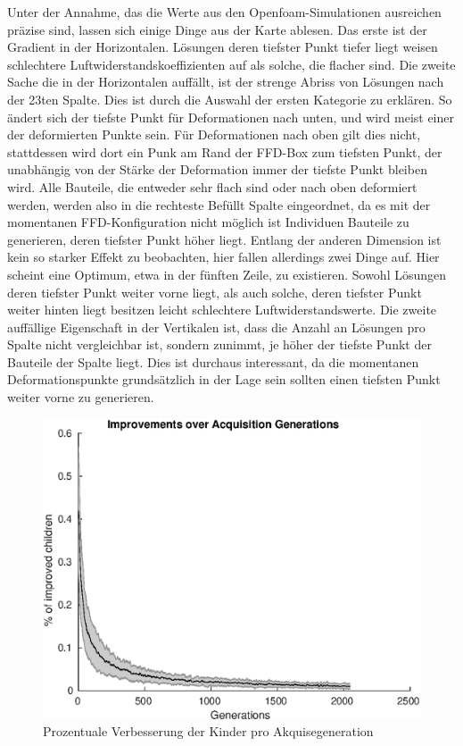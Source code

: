 Unter der Annahme, das die Werte aus den Openfoam-Simulationen ausreichen präzise sind, lassen sich einige Dinge aus der Karte ablesen.
Das erste ist der Gradient in der Horizontalen.
Lösungen deren tiefster Punkt tiefer liegt weisen schlechtere Luftwiderstandskoeffizienten auf als solche, die flacher sind.
Die zweite Sache die in der Horizontalen auffällt, ist der strenge Abriss von Lösungen nach der 23ten Spalte.
Dies ist durch die Auswahl der ersten Kategorie zu erklären.
So ändert sich der tiefste Punkt für Deformationen nach unten, und wird meist einer der deformierten Punkte sein.
Für Deformationen nach oben gilt dies nicht, stattdessen wird dort ein Punk am Rand der FFD-Box zum tiefsten Punkt, der unabhängig von der Stärke der Deformation immer der tiefste Punkt bleiben wird.
Alle Bauteile, die entweder sehr flach sind oder nach oben deformiert werden, werden also in die rechteste Befüllt Spalte eingeordnet, da es mit der momentanen FFD-Konfiguration nicht möglich ist Individuen Bauteile zu generieren, deren tiefster Punkt höher liegt.
Entlang der anderen Dimension ist kein so starker Effekt zu beobachten, hier fallen allerdings zwei Dinge auf.
Hier scheint eine Optimum, etwa in der fünften Zeile, zu existieren.
Sowohl Lösungen deren tiefster Punkt weiter vorne liegt, als auch solche, deren tiefster Punkt weiter hinten liegt besitzen leicht schlechtere Luftwiderstandswerte.
Die zweite auffällige Eigenschaft in der Vertikalen ist, dass die Anzahl an Lösungen pro Spalte nicht vergleichbar ist, sondern zunimmt, je höher der tiefste Punkt der Bauteile der Spalte liegt.
Dies ist durchaus interessant, da die momentanen Deformationspunkte grundsätzlich in der Lage sein sollten einen tiefsten Punkt weiter vorne zu generieren.

\begin{figure}[h]
	\centering
	\includegraphics[width=.7\linewidth]{bilder/escooter/acqImprovements}
	\caption{Prozentuale Verbesserung der Kinder pro Akquisegeneration}
	\label{fig:escooteracqImprovement}
\end{figure}

